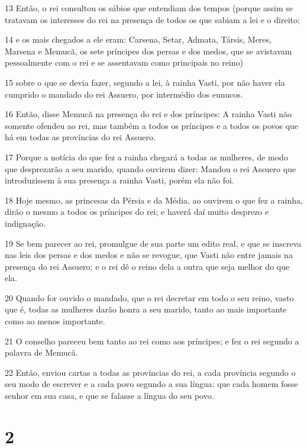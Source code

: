 \par 13 Então, o rei consultou os sábios que entendiam dos tempos (porque assim se tratavam os interesses do rei na presença de todos os que sabiam a lei e o direito;
\par 14 e os mais chegados a ele eram: Carsena, Setar, Admata, Társis, Meres, Marsena e Memucã, os sete príncipes dos persas e dos medos, que se avistavam pessoalmente com o rei e se assentavam como principais no reino)
\par 15 sobre o que se devia fazer, segundo a lei, à rainha Vasti, por não haver ela cumprido o mandado do rei Assuero, por intermédio dos eunucos.
\par 16 Então, disse Memucã na presença do rei e dos príncipes: A rainha Vasti não somente ofendeu ao rei, mas também a todos os príncipes e a todos os povos que há em todas as províncias do rei Assuero.
\par 17 Porque a notícia do que fez a rainha chegará a todas as mulheres, de modo que desprezarão a seu marido, quando ouvirem dizer: Mandou o rei Assuero que introduzissem à sua presença a rainha Vasti, porém ela não foi.
\par 18 Hoje mesmo, as princesas da Pérsia e da Média, ao ouvirem o que fez a rainha, dirão o mesmo a todos os príncipes do rei; e haverá daí muito desprezo e indignação.
\par 19 Se bem parecer ao rei, promulgue de sua parte um edito real, e que se inscreva nas leis dos persas e dos medos e não se revogue, que Vasti não entre jamais na presença do rei Assuero; e o rei dê o reino dela a outra que seja melhor do que ela.
\par 20 Quando for ouvido o mandado, que o rei decretar em todo o seu reino, vasto que é, todas as mulheres darão honra a seu marido, tanto ao mais importante como ao menos importante.
\par 21 O conselho pareceu bem tanto ao rei como aos príncipes; e fez o rei segundo a palavra de Memucã.
\par 22 Então, enviou cartas a todas as províncias do rei, a cada província segundo o seu modo de escrever e a cada povo segundo a sua língua: que cada homem fosse senhor em sua casa, e que se falasse a língua do seu povo.

\chapter{2}

